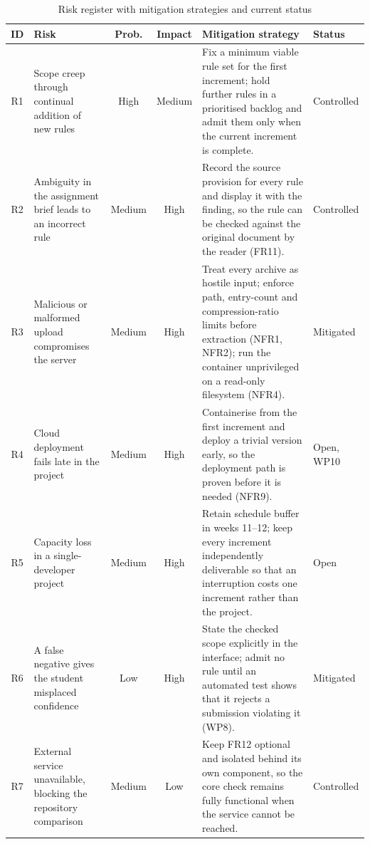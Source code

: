 \documentclass[a4paper,11pt]{article}
\begin{document}
\begin{table}[H]
\centering
\caption{Risk register with mitigation strategies and current status}
\label{tab:risks}
\footnotesize
\renewcommand{\arraystretch}{1.2}
\setlength{\tabcolsep}{4pt}
\begin{tabularx}{\textwidth}{|c|p{3.4cm}|c|c|X|p{1.7cm}|}
\hline
\rowcolor{gray!15}
\textbf{ID} & \textbf{Risk} & \textbf{Prob.} & \textbf{Impact} & \textbf{Mitigation strategy} & \textbf{Status} \\
\hline
\hline
R1 & Scope creep through continual addition of new rules & High & Medium & Fix a minimum viable rule set for the first increment; hold further rules in a prioritised backlog and admit them only when the current increment is complete. & Controlled \\
\hline
R2 & Ambiguity in the assignment brief leads to an incorrect rule & Medium & High & Record the source provision for every rule and display it with the finding, so the rule can be checked against the original document by the reader (FR11). & Controlled \\
\hline
R3 & Malicious or malformed upload compromises the server & Medium & High & Treat every archive as hostile input; enforce path, entry-count and compression-ratio limits before extraction (NFR1, NFR2); run the container unprivileged on a read-only filesystem (NFR4). & Mitigated \\
\hline
R4 & Cloud deployment fails late in the project & Medium & High & Containerise from the first increment and deploy a trivial version early, so the deployment path is proven before it is needed (NFR9). & Open, WP10 \\
\hline
R5 & Capacity loss in a single-developer project & Medium & High & Retain schedule buffer in weeks 11--12; keep every increment independently deliverable so that an interruption costs one increment rather than the project. & Open \\
\hline
R6 & A false negative gives the student misplaced confidence & Low & High & State the checked scope explicitly in the interface; admit no rule until an automated test shows that it rejects a submission violating it (WP8). & Mitigated \\
\hline
R7 & External service unavailable, blocking the repository comparison & Medium & Low & Keep FR12 optional and isolated behind its own component, so the core check remains fully functional when the service cannot be reached. & Controlled \\
\hline
\end{tabularx}
\end{table}
\end{document}
